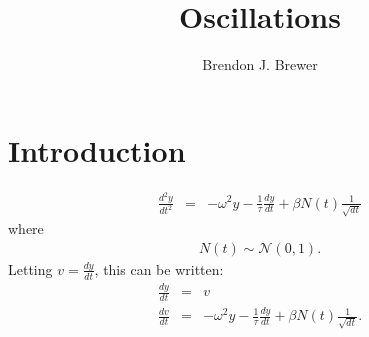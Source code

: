 \documentclass[letterpaper, 11pt]{article}
\title{Oscillations}
\author{Brendon J. Brewer}
\begin{document}
\maketitle

\section{Introduction}

\begin{eqnarray}
\frac{d^2y}{dt^2} &=& -\omega^2 y - \frac{1}{\tau}\frac{dy}{dt}
+ \beta N(t)\frac{1}{\sqrt{dt}}
\end{eqnarray}
where
\begin{eqnarray}
N(t) \sim \mathcal{N}(0, 1).
\end{eqnarray}
Letting $v = \frac{dy}{dt}$, this can be written:
\begin{eqnarray}
\frac{dy}{dt} &=& v \\
\frac{dv}{dt} &=& -\omega^2 y - \frac{1}{\tau}\frac{dy}{dt}
+ \beta N(t)\frac{1}{\sqrt{dt}}.
\end{eqnarray}
\end{document}
